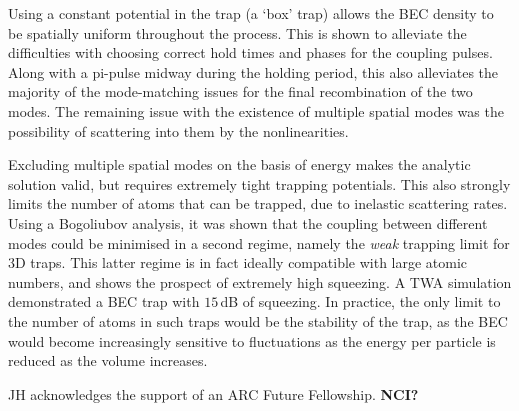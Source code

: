 \documentclass{iopart}
\begin{document}
Using a constant potential in the trap (a `box' trap) allows the BEC density to be spatially uniform throughout the process.  This is shown to alleviate the difficulties with choosing correct hold times and phases for the coupling pulses.  Along with a pi-pulse midway during the holding period, this also alleviates the majority of the mode-matching issues for the final recombination of the two modes.  The remaining issue with the existence of multiple spatial modes was the possibility of scattering into them by the nonlinearities.

Excluding multiple spatial modes on the basis of energy makes the analytic solution valid, but requires extremely tight trapping potentials.  This also strongly limits the number of atoms that can be trapped, due to inelastic scattering rates.  
Using a Bogoliubov analysis, it was shown that the coupling between different modes could be minimised in a second regime, namely the \textit{weak} trapping limit for 3D traps.  This latter regime is in fact ideally compatible with large atomic numbers, and shows the prospect of extremely high squeezing.  A TWA simulation demonstrated a BEC trap with $15$\,dB of squeezing.  In practice, the only limit to the number of atoms in such traps would be the stability of the trap, as the BEC would become increasingly sensitive to fluctuations as the energy per particle is reduced as the volume increases.

\ack
JH acknowledges the support of an ARC Future Fellowship.  \textbf{NCI?}

\clearpage

\appendix
\end{document}
